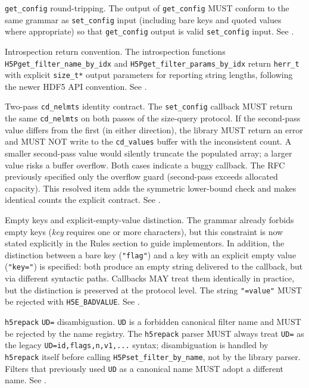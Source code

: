 \documentclass[../HDF5_RFC.tex]{subfiles}
\begin{document}
\texttt{get\_config} round-tripping. The output of \texttt{get\_config} MUST conform
to the same grammar as \texttt{set\_config} input (including bare keys and quoted
values where appropriate) so that \texttt{get\_config} output is valid
\texttt{set\_config} input. See .

Introspection return convention. The introspection functions
\texttt{H5Pget\_filter\_name\_by\_idx} and \texttt{H5Pget\_filter\_params\_by\_idx} return
\texttt{herr\_t} with explicit \texttt{size\_t*} output parameters for reporting string
lengths, following the newer HDF5 API convention. See
.

Two-pass \texttt{cd\_nelmts} identity contract. The \texttt{set\_config} callback MUST
return the same \texttt{cd\_nelmts} on both passes of the size-query protocol. If
the second-pass value differs from the first (in either direction), the
library MUST return an error and MUST NOT write to the \texttt{cd\_values} buffer
with the inconsistent count. A smaller second-pass value would silently
truncate the populated array; a larger value risks a buffer overflow. Both
cases indicate a buggy callback. The RFC previously specified only the
overflow guard (second-pass exceeds allocated capacity). This resolved item
adds the symmetric lower-bound check and makes identical counts the explicit
contract. See .

Empty keys and explicit-empty-value distinction. The grammar already
forbids empty keys (\textit{key} requires one or more characters), but this
constraint is now stated explicitly in the Rules section to guide
implementors. In addition, the distinction between a bare key (\texttt{"flag"})
and a key with an explicit empty value (\texttt{"key="}) is specified: both
produce an empty string delivered to the callback, but via different
syntactic paths. Callbacks MAY treat them identically in practice, but the
distinction is preserved at the protocol level. The string \texttt{"=value"} MUST
be rejected with \texttt{H5E\_BADVALUE}. See .

\texttt{h5repack} \texttt{UD=} disambiguation. \texttt{UD} is a forbidden canonical
filter name and MUST be rejected by the name registry. The \texttt{h5repack}
parser MUST always treat \texttt{UD=} as the legacy \texttt{UD=id,flags,n,v1,...}
syntax; disambiguation is handled by \texttt{h5repack} itself before calling
\texttt{H5Pset\_filter\_by\_name}, not by the library parser. Filters that
previously used \texttt{UD} as a canonical name MUST adopt a different name.
See .
\end{document}
